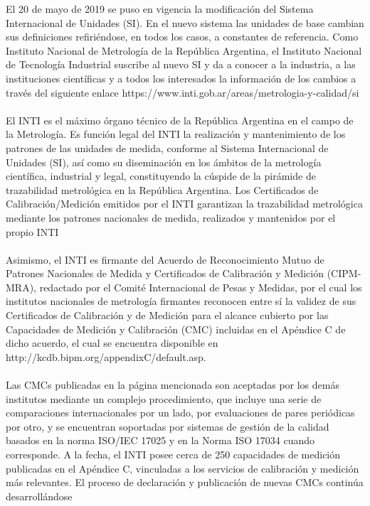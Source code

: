 \noindent El 20 de mayo de 2019 se puso en vigencia la modificación del Sistema Internacional de Unidades (SI). En el nuevo sistema las unidades de base cambian sus definiciones refiriéndose, en todos los casos, a constantes de referencia. Como Instituto Nacional de Metrología de la República Argentina, el Instituto Nacional de Tecnología Industrial suscribe al nuevo SI y da a conocer a la industria, a las instituciones científicas y a todos los interesados la información de los cambios a través del siguiente enlace https://www.inti.gob.ar/areas/metrologia-y-calidad/si \\\\
\noindent El INTI es el máximo órgano técnico de la República Argentina en el campo de la Metrología. Es función legal del INTI la realización y mantenimiento de los patrones de las unidades de medida, conforme al Sistema Internacional de Unidades (SI), así como su diseminación en los ámbitos de la metrología científica, industrial y legal, constituyendo la cúspide de la pirámide de trazabilidad metrológica en la República Argentina. Los Certificados de Calibración/Medición emitidos por el INTI garantizan la trazabilidad metrológica mediante los patrones nacionales de medida, realizados y mantenidos por el propio INTI
\\\\
\noindent Asimismo, el INTI es firmante del Acuerdo de Reconocimiento Mutuo de Patrones Nacionales de Medida y Certificados de Calibración y Medición (CIPM-MRA), redactado por el Comité Internacional de Pesas y Medidas, por el cual los institutos nacionales de metrología firmantes reconocen entre sí la validez de sus Certificados de Calibración y de Medición para el alcance cubierto por las Capacidades de Medición y Calibración (CMC) incluidas en el Apéndice C de dicho acuerdo, el cual se encuentra disponible en http://kcdb.bipm.org/appendixC/default.asp.
\\\\
\noindent Las CMCs publicadas en la página mencionada son aceptadas por los demás institutos mediante un complejo procedimiento, que incluye una serie de comparaciones internacionales por un lado, por evaluaciones de pares periódicas por otro, y se encuentran soportadas por sistemas de gestión de la calidad basados en la norma ISO/IEC 17025 y en la Norma ISO 17034 cuando corresponde. A la fecha, el INTI posee cerca de 250 capacidades de medición publicadas en el Apéndice C, vinculadas a los servicios de calibración y medición más relevantes. El proceso de declaración y publicación de nuevas CMCs continúa desarrollándose
